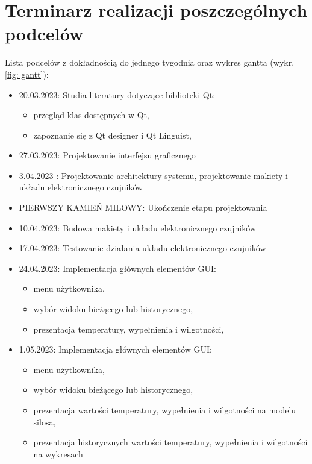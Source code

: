 \section{Terminarz realizacji poszczególnych podcelów}
    Lista podcelów z dokładnością do jednego tygodnia oraz wykres gantta (wykr. \ref{fig: gantt}):
\begin{itemize}
    \item 
        20.03.2023: Studia literatury dotyczące biblioteki Qt:
        \begin{itemize}
            \item przegląd klas dostępnych w Qt,
            \item zapoznanie się z Qt designer i Qt Linguist,
        \end{itemize} 
    \item 
        27.03.2023: Projektowanie interfejsu graficznego
    \item 
        3.04.2023 : Projektowanie architektury systemu, projektowanie makiety i układu elektronicznego czujników
        \item PIERWSZY KAMIEŃ MILOWY: Ukończenie etapu projektowania
    \item 
        10.04.2023: Budowa makiety i układu elektronicznego czujników
    \item 
        17.04.2023: Testowanie działania układu elektronicznego czujników
    \item 
        24.04.2023: Implementacja głównych elementów GUI:
        \begin{itemize}
            \item menu użytkownika,
            \item wybór widoku bieżącego lub historycznego,
            \item prezentacja temperatury, wypełnienia i wilgotności,
        \end{itemize}
    \item 
        1.05.2023: Implementacja głównych elementów GUI:
        \begin{itemize}
            \item menu użytkownika,
            \item wybór widoku bieżącego lub historycznego,
            \item prezentacja wartości temperatury, wypełnienia i wilgotności na modelu silosa,
            \item prezentacja historycznych wartości temperatury, wypełnienia i wilgotności na wykresach
        \end{itemize}

\end{itemize}
